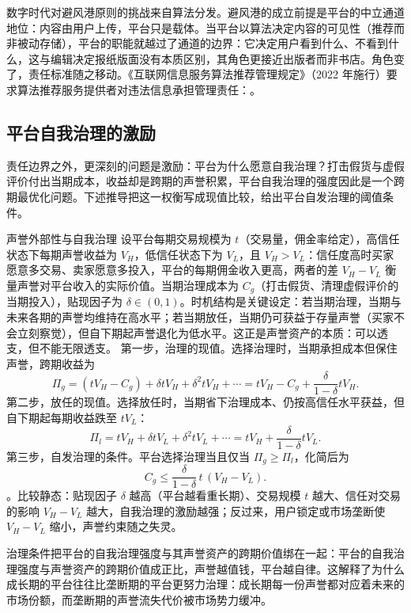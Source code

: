 数字时代对避风港原则的挑战来自算法分发。避风港的成立前提是平台的中立通道地位：内容由用户上传，平台只是载体。当平台以算法决定内容的可见性（推荐而非被动存储），平台的职能就越过了通道的边界：它决定用户看到什么、不看到什么，这与编辑决定报纸版面没有本质区别，其角色更接近出版者而非书店。角色变了，责任标准随之移动。《互联网信息服务算法推荐管理规定》（2022 年施行）要求算法推荐服务提供者对违法信息承担管理责任：。

\subsection{平台自我治理的激励}

责任边界之外，更深刻的问题是激励：平台为什么愿意自我治理？打击假货与虚假评价付出当期成本，收益却是跨期的声誉积累，平台自我治理的强度因此是一个跨期最优化问题。下述推导把这一权衡写成现值比较，给出平台自发治理的阈值条件。

\begin{derivation}{声誉外部性与自我治理}{}
设平台每期交易规模为 $t$（交易量，佣金率给定），高信任状态下每期声誉收益为 $V_H$，低信任状态下为 $V_L$，且 $V_H > V_L$：信任度高时买家愿意多交易、卖家愿意多投入，平台的每期佣金收入更高，两者的差 $V_H - V_L$ 衡量声誉对平台收入的实际价值。当期治理成本为 $C_g$（打击假货、清理虚假评价的当期投入），贴现因子为 $\delta \in (0,1)$。时机结构是关键设定：若当期治理，当期与未来各期的声誉均维持在高水平；若当期放任，当期仍可获益于存量声誉（买家不会立刻察觉），但自下期起声誉退化为低水平。这正是声誉资产的本质：可以透支，但不能无限透支。
第一步，治理的现值。选择治理时，当期承担成本但保住声誉，跨期收益为
\[
\Pi_g = (tV_H - C_g) + \delta t V_H + \delta^2 t V_H + \cdots = tV_H - C_g + \frac{\delta}{1-\delta} t V_H.
\]
第二步，放任的现值。选择放任时，当期省下治理成本、仍按高信任水平获益，但自下期起每期收益跌至 $tV_L$：
\[
\Pi_l = tV_H + \delta t V_L + \delta^2 t V_L + \cdots = tV_H + \frac{\delta}{1-\delta} t V_L.
\]
第三步，自发治理的条件。平台选择治理当且仅当 $\Pi_g \ge \Pi_l$，化简后为
\[
C_g \le \frac{\delta}{1-\delta}\, t\, (V_H - V_L).
\]
。比较静态：贴现因子 $\delta$ 越高（平台越看重长期）、交易规模 $t$ 越大、信任对交易的影响 $V_H - V_L$ 越大，自我治理的激励越强；反过来，用户锁定或市场垄断使 $V_H - V_L$ 缩小，声誉约束随之失灵。
\end{derivation}

治理条件把平台的自我治理强度与其声誉资产的跨期价值绑在一起：平台的自我治理强度与声誉资产的跨期价值成正比，声誉越值钱，平台越自律。这解释了为什么成长期的平台往往比垄断期的平台更努力治理：成长期每一份声誉都对应着未来的市场份额，而垄断期的声誉流失代价被市场势力缓冲。

